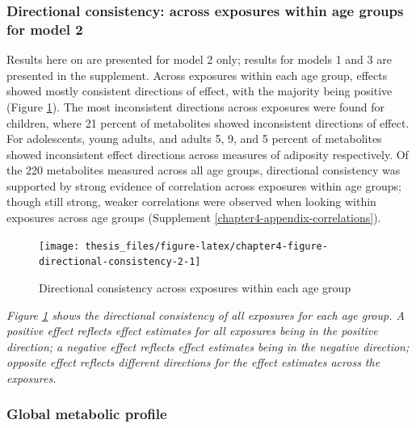 \documentclass[11pt,twoside]{bristolthesis}
\newcommand{\bsmall}{\begin{small}}
\newcommand{\esmall}{\end{small}}
\begin{document}
\hypertarget{directional-consistency-across-exposures-within-age-groups-for-model-2}{%
\subsubsection{Directional consistency: across exposures within age groups for model 2}\label{directional-consistency-across-exposures-within-age-groups-for-model-2}}

Results here on are presented for model 2 only; results for models 1 and 3 are presented in the supplement. Across exposures within each age group, effects showed mostly consistent directions of effect, with the majority being positive (Figure \ref{fig:chapter4-figure-directional-consistency-2}). The most inconsistent directions across exposures were found for children, where 21 percent of metabolites showed inconsistent directions of effect. For adolescents, young adults, and adults 5, 9, and 5 percent of metabolites showed inconsistent effect directions across measures of adiposity respectively. Of the 220 metabolites measured across all age groups, directional consistency was supported by strong evidence of correlation across exposures within age groups; though still strong, weaker correlations were observed when looking within exposures across age groups (Supplement \ref{chapter4-appendix-correlations}).
\begin{figure}
\texttt{[image: thesis\_files/figure-latex/chapter4-figure-directional-consistency-2-1]} \caption{Directional consistency across exposures within each age group}\label{fig:chapter4-figure-directional-consistency-2}
\end{figure}
\noindent 
\bsmall
\emph{Figure \ref{fig:chapter4-figure-directional-consistency-2} shows the directional consistency of all exposures for each age group. A positive effect reflects effect estimates for all exposures being in the positive direction; a negative effect reflects effect estimates being in the negative direction; opposite effect reflects different directions for the effect estimates across the exposures.}
\esmall
\noindent 

\hypertarget{global-metabolic-profile}{%
\subsubsection{Global metabolic profile}\label{global-metabolic-profile}}
\end{document}
